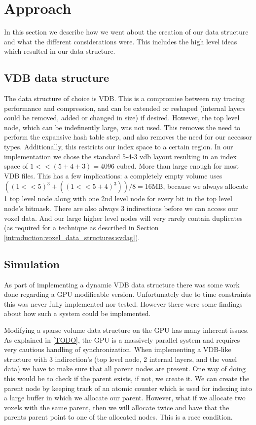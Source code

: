 \section{Approach} \label{approach}
In this section we describe how we went about the creation of our data structure and what the different considerations were. This includes the high level ideas which resulted in our data structure.
\subsection{VDB data structure} \label{approach:vdb_data_structure}
The data structure of choice is VDB. This is a compromise between ray tracing performance and compression, and can be extended or reshaped (internal layers could be removed, added or changed in size) if desired. However, the top level node, which can be indefinently large, was not used. This removes the need to perform the expansive hash table step, and also removes the need for our accessor types. Additionally, this restricts our index space to a certain region. In our implementation we chose the standard 5-4-3 vdb layout resulting in an index space of $1 << (5+4+3) = 4096$ cubed. More than large enough for most VDB files. This has a few implications: a completely empty volume uses $((1<<5)^3+((1<<5+4)^3)) / 8 = 16$MB, because we always allocate 1 top level node along with one 2nd level node for every bit in the top level node's bitmask. There are also always 3 indirections before we can access our voxel data. And our large higher level nodes will very rarely contain duplicates (as required for a technique as described in Section \ref{introduction:voxel_data_structures:svdag}).

\subsection{Simulation} \label{approach:simulation}
As part of implementing a dynamic VDB data structure there was some work done regarding a GPU modifieable version. Unfortunately due to time constraints this was never fully implemented nor tested. However there were some findings about how such a system could be implemented.

Modifying a sparse volume data structure on the GPU has many inherent issues. As explained in \ref{TODO}, the GPU is a massively parallel system and requires very cautious handling of synchronization. When implementing a VDB-like structure with 3 indirection's (top level node, 2 internal layers, and the voxel data) we have to make sure that all parent nodes are present. One way of doing this would be to check if the parent exists, if not, we create it. We can create the parent node by keeping track of an atomic counter which is used for indexing into a large buffer in which we allocate our parent. However, what if we allocate two voxels with the same parent, then we will allocate twice and have that the parents parent point to one of the allocated nodes. This is a race condition.

